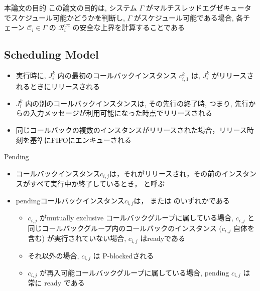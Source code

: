 \begin{frame}{本論文の目的}
    この論文の目的は, システム $\Gamma$ がマルチスレッドエグゼキュータでスケジュール可能かどうかを判断し, $\Gamma$ がスケジュール可能である場合, 各チェーン $\mathcal{C}_{i} \in \Gamma$ の $\mathcal{R}_{i}^{w c}$ の安全な上界を計算することである
\end{frame}


\subsection{Scheduling Model}
\label{ssec: scheduling_model}


\begin{frame}{}
    \begin{itemize}
        \item 実行時に, $J_{i}^{k}$ 内の最初のコールバックインスタンス $c_{i, 1}^{k}$ は, $J_{i}^{k}$ がリリースされるときにリリースされる
        \item $J_{i}^{k}$ 内の別のコールバックインスタンスは, その先行の終了時, つまり, 先行からの入力メッセージが利用可能になった時点でリリースされる
        \item 同じコールバックの複数のインスタンスがリリースされた場合，リリース時刻を基準にFIFOにエンキューされる
    \end{itemize}
\end{frame}

\begin{frame}{Pending}


    \begin{itemize}
        \item コールバックインスタンス$c_{i, j}$は，それがリリースされ，その前のインスタンスがすべて実行中か終了しているとき， と呼ぶ
        \item pendingコールバックインスタンス$c_{i, j}$は， または のいずれかである
              \begin{itemize}
                  \item  $c_{i, j}$ がmutually exclusive コールバックグループに属している場合, $c_{i, j}$ と同じコールバックグループ内のコールバックのインスタンス ($c_{i, j}$ 自体を含む) が実行されていない場合, $c_{i, j}$ はreadyである
                  \item それ以外の場合, $c_{i, j}$ は P-blockedされる

                  \item  $c_{i, j}$ が再入可能コールバックグループに属している場合, pending $c_{i, j}$ は常に ready である
              \end{itemize}
    \end{itemize}
\end{frame}

